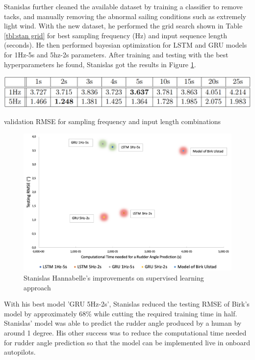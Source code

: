 \documentclass[12pt,twoside]{report}
\begin{document}
Stanislas further cleaned the available dataset by training a classifier to remove tacks, and manually removing the abnormal sailing conditions such as extremely light wind. With the new dataset, he performed the grid search shown in Table \ref{tbl:stan grid} for best sampling frequency (Hz) and input sequence length (seconds). He then performed bayesian optimization for LSTM and GRU models for 1Hz-5s and 5hz-2s parameters. After training and testing with the best hyperparameters he found, Stanislas got the results in Figure \ref{fig:stan results}.

\begin{table}[h]
\centering
\includegraphics[width=\linewidth]{figures/stan grid search.png}
\caption{validation RMSE for sampling frequency and input length combinations}
\label{tbl:stan grid}
\end{table}

\begin{figure}[h]
\centering
\includegraphics[width = 0.8\hsize]{figures/stan results.png}
\caption{Stanislas Hannabelle's improvements on supervised learning approach}
\label{fig:stan results}
\end{figure}

With his best model 'GRU 5Hz-2s', Stanislas reduced the testing RMSE of Birk's model by approximately 68\% while cutting the required training time in half. Stanislas' model was able to predict the rudder angle produced by a human by around 1 degree. His other success was to reduce the computational time needed for rudder angle prediction so that the model can be implemented live in onboard autopilots.
\end{document}
